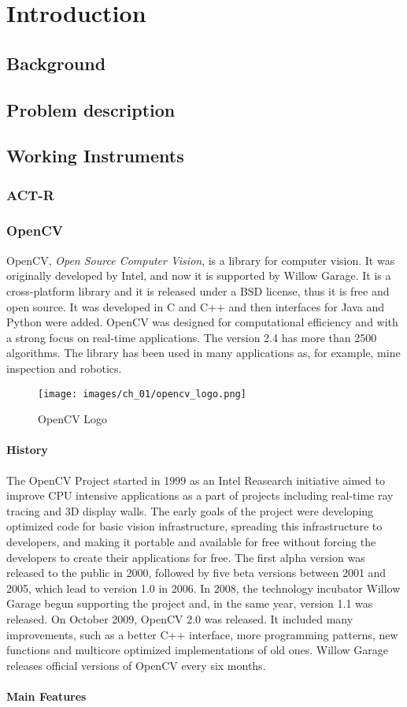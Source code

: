\chapter{Introduction}
\section{Background}
\section{Problem description}
\section{Working Instruments}
\subsection{ACT-R}
\subsection{OpenCV}
	OpenCV, \emph{Open Source Computer Vision}, is a library for computer vision. It was originally developed by Intel, and now it is supported by Willow Garage.
	It is a cross-platform library and it is released under a BSD license, thus it is free and open source. It was developed in C and C++ and then interfaces for Java and Python were added. OpenCV was designed for computational efficiency and with a strong focus on real-time applications. The version 2.4 has more than 2500 algorithms. The library has been used in many applications as, for example, mine inspection and robotics.
	\begin{wrapfigure}{l}{0.2\textwidth}
  		\begin{center}
  	  	\texttt{[image: images/ch\_01/opencv\_logo.png]}
  		\end{center}
  		\caption{OpenCV Logo}
	\end{wrapfigure}		
	
	\subsubsection*{History}
	The OpenCV Project started in 1999 as an Intel Reasearch initiative aimed to improve CPU intensive applications as a part of projects including real-time ray tracing and 3D display walls. The early goals of the project were developing optimized code for basic vision infrastructure, spreading this infrastructure to developers, and making it portable and available for free without forcing the developers to create their applications for free.
	The first alpha version was released to the public in 2000, followed by five beta versions between 2001 and 2005, which lead to version 1.0 in 2006. In 2008, the technology incubator Willow Garage begun supporting the project and, in the same year, version 1.1  was released. 
	On October 2009, OpenCV 2.0 was released. It included many improvements, such as a better C++ interface, more programming patterns, new functions and multicore optimized implementations of old ones. Willow Garage releases official versions of OpenCV every six months.
	\subsubsection*{Main Features}
	